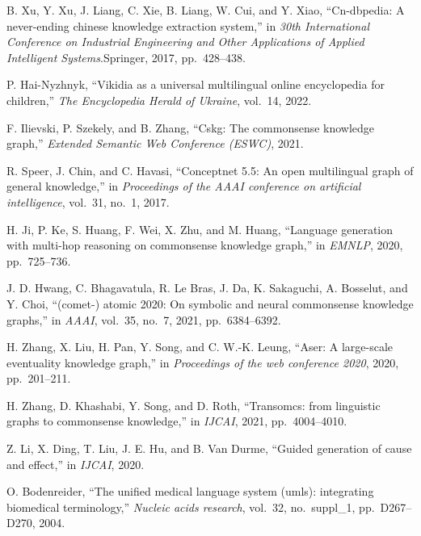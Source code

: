 \begin{enumerate}[leftmargin=2em,label={[\arabic*]}]
\item B. Xu, Y. Xu, J. Liang, C. Xie, B. Liang, W. Cui, and Y. Xiao, ``Cn-dbpedia: A never-ending chinese knowledge extraction system,'' in \textit{30th International Conference on Industrial Engineering and Other Applications of Applied Intelligent Systems}.\quad Springer, 2017, pp.~428--438.

\item P. Hai-Nyzhnyk, ``Vikidia as a universal multilingual online encyclopedia for children,'' \textit{The Encyclopedia Herald of Ukraine}, vol.~14, 2022.

\item F. Ilievski, P. Szekely, and B. Zhang, ``Cskg: The commonsense knowledge graph,'' \textit{Extended Semantic Web Conference (ESWC)}, 2021.

\item R. Speer, J. Chin, and C. Havasi, ``Conceptnet 5.5: An open multilingual graph of general knowledge,'' in \textit{Proceedings of the AAAI conference on artificial intelligence}, vol.~31, no.~1, 2017.

\item H. Ji, P. Ke, S. Huang, F. Wei, X. Zhu, and M. Huang, ``Language generation with multi-hop reasoning on commonsense knowledge graph,'' in \textit{EMNLP}, 2020, pp.~725--736.

\item J. D. Hwang, C. Bhagavatula, R. Le Bras, J. Da, K. Sakaguchi, A. Bosselut, and Y. Choi, ``(comet-) atomic 2020: On symbolic and neural commonsense knowledge graphs,'' in \textit{AAAI}, vol.~35, no.~7, 2021, pp.~6384--6392.

\item H. Zhang, X. Liu, H. Pan, Y. Song, and C. W.-K. Leung, ``Aser: A large-scale eventuality knowledge graph,'' in \textit{Proceedings of the web conference 2020}, 2020, pp.~201--211.

\item H. Zhang, D. Khashabi, Y. Song, and D. Roth, ``Transomcs: from linguistic graphs to commonsense knowledge,'' in \textit{IJCAI}, 2021, pp.~4004--4010.

\item Z. Li, X. Ding, T. Liu, J. E. Hu, and B. Van Durme, ``Guided generation of cause and effect,'' in \textit{IJCAI}, 2020.

\item O. Bodenreider, ``The unified medical language system (umls): integrating biomedical terminology,'' \textit{Nucleic acids research}, vol.~32, no.~suppl\_1, pp.~D267--D270, 2004.


\end{enumerate}
